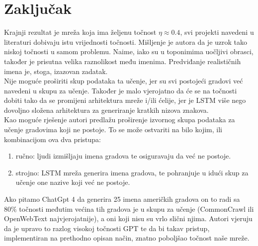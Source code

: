 \documentclass[conference]{IEEEtran}
\begin{document}
\section{Zaključak} \label{sect:zakljucak}
Krajnji rezultat je mreža koja ima željenu točnost $\eta \approx 0.4$, svi projekti navedeni u literaturi dobivaju istu vrijednosti točnosti. Mišljenje je autora da je uzrok tako niskoj točnosti u samom problemu. Naime, iako su u toponimima uočljivi obrasci, također je prisutna velika raznolikost među imenima. Predviđanje realističnih imena je, stoga, izazovan zadatak.\\
Nije moguće proširiti skup podataka ta učenje, jer su svi postojeći gradovi već navedeni u skupu za učenje. Također je malo vjerojatno da će se na točnosti dobiti tako da se promijeni arhitektura mreže i/ili ćelije, jer je LSTM više nego dovoljno složena arhitektura za generiranje kratkih nizova znakova.\\
Kao moguće rješenje autori predlažu proširenje izvornog skupa podataka za učenje gradovima koji ne postoje. To se može ostvariti na bilo kojim, ili kombinacijom ova dva pristupa:
\begin{enumerate}
\item ručno: ljudi izmišljaju imena gradova te osiguravaju da već ne postoje.
\item strojno: LSTM mreža generira imena gradova, te pohranjuje u idući skup za učenje one nazive koji već ne postoje.
\end{enumerate}

Ako pitamo ChatGpt 4 da generira 25 imena američkih gradova on to radi sa $80\%$ točnosti međutim većina tih gradova je u skupu za učenje (CommonCrawl ili OpenWebText najvjerojatnije), a oni koji nisu su vrlo slični njima. Autori vjeruju da je upravo to razlog visokoj točnosti GPT te da bi takav pristup, implementiran na prethodno opisan način, znatno poboljšao točnost naše mreže.
\end{document}

